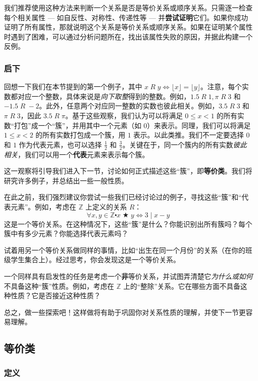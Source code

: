 我们推荐使用这种方法来判断一个关系是否是等价关系或顺序关系。只需逐一检查每个相关属性 --- 如自反性、对称性、传递性等 --- 并\textbf{尝试证明}它们。如果你成功证明了所有属性，那就说明这个关系是等价关系或顺序关系。如果在证明某个属性时遇到了困难，可以通过分析问题所在，找出该属性失败的原因，并据此构建一个反例。

\subsubsection*{启下}

回想一下我们在本节提到的第一个例子，其中 $x \;R\; y \iff \lfloor x \rfloor = \lfloor y \rfloor$。注意，每个实数都对应一个整数，具体来说是\emph{向下取整}得到的整数。例如，$1.5 \;R\; 1, \pi \;R\; 3$ 和 $-1.5 \;R\; -2$。此外，任意两个对应同一整数的实数也彼此相关。例如，$3.5 \;R\; 3$ 和 $\pi \;R\; 3$，因此 $3.5 \;R\; \pi$。基于这些观察，我们认为可以将满足 $0 \le x < 1$ 的所有实数``打包''成一个``簇''，并用其中一个元素（如 $0$）来表示。同理，我们可以将满足 $1 \le x < 2$ 的所有实数打包成一个簇，用 $1$ 表示。以此类推。我们不一定要选择 $0$ 和 $1$ 作为代表元素，也可以选择 $\frac{1}{2}$ 和 $\frac{3}{2}$。关键在于，同一个簇内的所有实数\emph{彼此相关}，我们可以用一个\textbf{代表}元素来表示每个簇。

这一观察将引导我们进入下一节，讨论如何正式描述这些``簇''，即\textbf{等价类}。我们将研究许多例子，并总结出一些一般性质。

在此之前，我们强烈建议你尝试一些我们已经讨论过的例子，寻找这些``簇''和``代表元素''。例如，考虑在 $\mathbb{Z}$ 上定义的关系 $R$：
\[\forall x, y \in \mathbb{Z} \centerdot x \;\bigstar\; y \iff 3 \mid x - y\]
这是一个等价关系。在这种情况下，这些``簇''是什么？你能识别出所有簇吗？每个簇中有多少元素？你能选择代表元素吗？

试着用另一个等价关系做同样的事情，比如``出生在同一个月份''的关系（在你的班级学生集合上）。经过思考，你会发现这是一个等价关系。

一个同样具有启发性的任务是考虑一个\textbf{非}等价关系，并试图弄清楚它\emph{为什么或如何}不具备这种``簇''性质。例如，考虑在 $\mathbb{Z}$ 上的``整除''关系。它在哪些方面不具备这种性质？它是否接近这种性质？

总之，做一些探索吧！这样做将有助于巩固你对关系性质的理解，并使下一节更容易理解。

\subsection{等价类}

\subsubsection*{定义}

